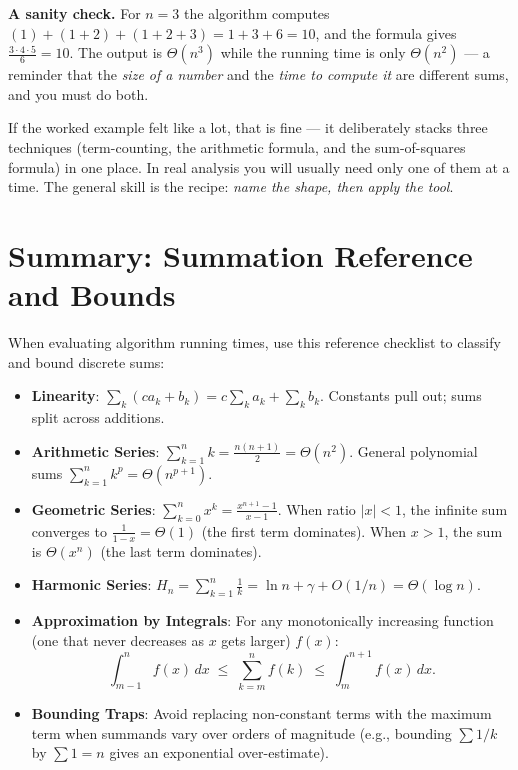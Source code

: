 \textbf{A sanity check.} For $n = 3$ the algorithm computes
$(1) + (1{+}2) + (1{+}2{+}3) = 1 + 3 + 6 = 10$, and the formula gives
$\tfrac{3\cdot 4\cdot 5}{6} = 10$. The output is $\Theta(n^3)$ while the running
time is only $\Theta(n^2)$ --- a reminder that the \emph{size of a number} and the
\emph{time to compute it} are different sums, and you must do both.

\begin{recoverybox}
If the worked example felt like a lot, that is fine --- it deliberately stacks
three techniques (term-counting, the arithmetic formula, and the sum-of-squares
formula) in one place. In real analysis you will usually need only one of them at
a time. The general skill is the recipe: \emph{name the shape, then apply the tool}.
\end{recoverybox}

\section{Summary: Summation Reference and Bounds}

When evaluating algorithm running times, use this reference checklist to
classify and bound discrete sums:
\begin{itemize}
  \item \textbf{Linearity}: $\sum_{k} (c a_k + b_k) = c \sum_{k} a_k + \sum_{k} b_k$.
    Constants pull out; sums split across additions.
  \item \textbf{Arithmetic Series}: $\sum_{k=1}^n k = \frac{n(n+1)}{2} = \Theta(n^2)$.
    General polynomial sums $\sum_{k=1}^n k^p = \Theta(n^{p+1})$.
  \item \textbf{Geometric Series}: $\sum_{k=0}^n x^k = \frac{x^{n+1}-1}{x-1}$.
    When ratio $|x| < 1$, the infinite sum converges to $\frac{1}{1-x} = \Theta(1)$
    (the first term dominates). When $x > 1$, the sum is $\Theta(x^n)$ (the last
    term dominates).
  \item \textbf{Harmonic Series}: $H_n = \sum_{k=1}^n \frac{1}{k} = \ln n + \gamma + O(1/n) = \Theta(\log n)$.
  \item \textbf{Approximation by Integrals}: For any monotonically increasing function (one that never decreases as $x$ gets larger) $f(x)$:
    \[
      \int_{m-1}^n f(x)\,dx \;\le\; \sum_{k=m}^n f(k) \;\le\; \int_m^{n+1} f(x)\,dx.
    \]
  \item \textbf{Bounding Traps}: Avoid replacing non-constant terms with the maximum
    term when summands vary over orders of magnitude (e.g., bounding $\sum 1/k$ by
    $\sum 1 = n$ gives an exponential over-estimate).
\end{itemize}

